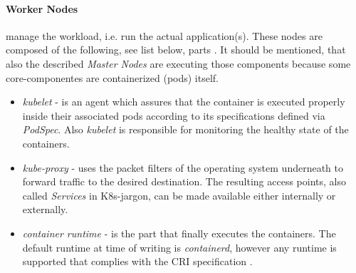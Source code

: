 \documentclass[MSC,Master,english]{twbook}%
\begin{document}
\paragraph{Worker Nodes} manage the workload, i.e. run the actual application(s). These nodes are composed of the following, see list below, parts \cite{k8scomp}. It should be mentioned, that also the described \textit{Master Nodes} are executing those components because some core-componentes are containerized (pods) itself. 
\begin{itemize}
    \item \textit{kubelet} - is an agent which assures that the container is executed properly inside their associated pods according to its specifications defined via \textit{PodSpec}. Also \textit{kubelet} is responsible for monitoring the healthy state of the containers.
    \item \textit{kube-proxy} - uses the packet filters of the operating system underneath to forward traffic to the desired destination. The resulting access points, also called \textit{Services} in \ac{K8s}-jargon, can be made available either internally or externally.
    \item \textit{container runtime} - is the part that finally executes the containers. The default runtime at time of writing is \textit{containerd}, however any runtime is supported that complies with the CRI specification \cite{cri-runtime}.
\end{itemize}
\end{document}

